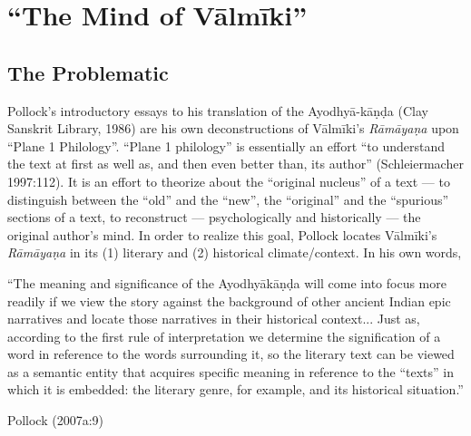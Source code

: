 \chapter{“The Mind of Vālmīki”}\label{chapter1}


\section{The Problematic}\label{sec1.1}

Pollock's introductory essays to his translation of the Ayodhyā-kāṇḍa (Clay Sanskrit Library, 1986) are his own deconstructions of Vālmīki’s {\sl Rāmāyaṇa} upon “Plane 1 Philology”. “Plane 1 philology” is essentially an effort “to understand the text at first as well as, and then even better than, its author” (Schleiermacher 1997:112). It is an effort to theorize about the “original nucleus” of a text --- to distinguish between the “old” and the “new”, the “original” and the “spurious” sections of a text, to reconstruct --- psychologically and historically --- the original author's mind. In order to realize this goal, Pollock locates Vālmīki’s {\sl Rāmāyaṇa} in its (1) literary and (2) historical climate/context. In his own words,  

\medskip
\begin{myquote}
“The meaning and significance of the Ayodhyākāṇḍa will come into focus more readily if we view the story against the background of other ancient Indian epic narratives and locate those narratives in their historical context... Just as, according to the first rule of  interpretation we determine the signification of a word in reference to the words surrounding it, so the literary text can be viewed as a semantic entity that acquires specific meaning in reference to the “texts” in which it is embedded: the literary genre, for example, and its historical situation.” 		
	       							         				      
\hfill  Pollock (2007a:9)
\end{myquote}



